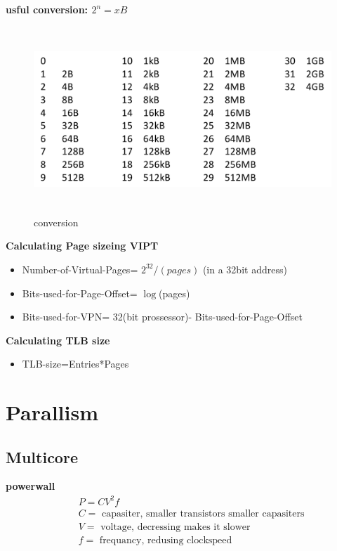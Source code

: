 \newpage

\textbf{usful conversion: $2^n=xB$}
\begin{figure}[h]
    \vspace{10mm}
    \centering
    \includegraphics[width=16cm, height=7cm]{image/conversion.png}
    \caption{conversion}
\end{figure}


\textbf{Calculating Page sizeing VIPT}
\begin{itemize}
\item  Number-of-Virtual-Pages= $2^{32}/(pages)$  (in a 32bit address)
\item  Bits-used-for-Page-Offset= $\log$(pages)
\item  Bits-used-for-VPN= 32(bit prossessor)- Bits-used-for-Page-Offset
\end{itemize}

\textbf{Calculating TLB size}
\begin{itemize}
\item  TLB-size=Entries*Pages
\end{itemize}


\newpage


\section{Parallism}

\subsection{Multicore}
\textbf{powerwall}
\begin{align*}
  &\quad P=CV^2f \\
  &\quad C= \text{ capasiter, smaller transistors smaller capasiters} \\
  &\quad V= \text{ voltage, decressing makes it slower} \\
  &\quad f= \text{ frequancy, redusing clockspeed} \\
\end{align*}

